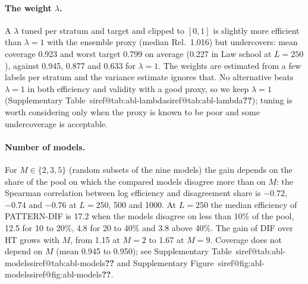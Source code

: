 \documentclass[pdflatex,sn-mathphys-num,iicol]{sn-jnl}
\makeatletter
\theoremstyle{thmstyleone}
\theoremstyle{thmstyletwo}
\theoremstyle{thmstylethree}
\newcommand{\SIref}[1]{\ifcsname siref@#1\endcsname\csname siref@#1\endcsname\else\textbf{??}\fi}
\makeatother
\begin{document}
\paragraph{The weight $\lambda$.} A $\lambda$ tuned per stratum and target and clipped to $[0,1]$ \citep[as in PPI++ and StratPPI;][]{angelopoulos2026ppipp,fisch2024stratppi} is slightly more efficient than $\lambda=1$ with the ensemble proxy (median Rel.\ 1.016) but undercovers: mean coverage 0.923 and worst target 0.799 on average (0.227 in Law school at $L=250$), against 0.945, 0.877 and 0.633 for $\lambda=1$. The weights are estimated from a few labels per stratum and the variance estimate ignores that. No alternative beats $\lambda=1$ in both efficiency and validity with a good proxy, so we keep $\lambda=1$ (Supplementary Table~\SIref{tab:abl-lambda}); tuning is worth considering only when the proxy is known to be poor and some undercoverage is acceptable.

\paragraph{Number of models.} For $M\in\{2,3,5\}$ (random subsets of the nine models) the gain depends on the share of the pool on which the compared models disagree more than on $M$: the Spearman correlation between log efficiency and disagreement share is $-0.72$, $-0.74$ and $-0.76$ at $L=250$, 500 and 1000. At $L=250$ the median efficiency of PATTERN-DIF is 17.2 when the models disagree on less than 10\% of the pool, 12.5 for 10 to 20\%, 4.8 for 20 to 40\% and 3.8 above 40\%. The gain of DIF over HT grows with $M$, from 1.15 at $M=2$ to 1.67 at $M=9$. Coverage does not depend on $M$ (mean 0.945 to 0.950); see Supplementary Table~\SIref{tab:abl-models} and Supplementary Figure~\SIref{fig:abl-models}.
\end{document}
